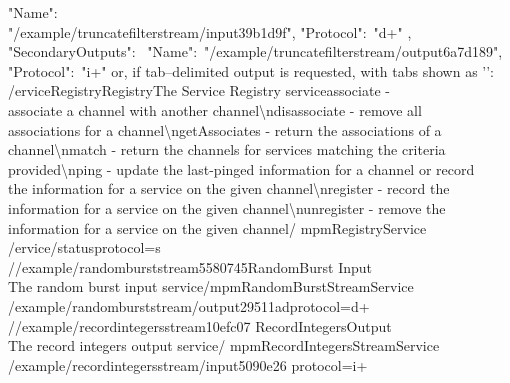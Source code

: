 \textbraceleft{} "Name":\ \\
"/example/truncatefilterstream/input\textunderscore{}39b1d9f", "Protocol":\ "d+"
\textbraceright{} \closeSq,\\
"SecondaryOutputs":\ \openSq{} \textbraceleft{} "Name":\
"/example/truncatefilterstream/output\textunderscore{}6a7d189", "Protocol":\ "i+"
\textbraceright{} \closeSq{} \textbraceright{} \closeSq
\outputEnd{}
or, if tab--delimited output is requested, with tabs shown as
'\texttt{\boldmath{$\vdash$}}':
\outputBegin{}
/\textdollar{}ervice\pseudotab{}Registry\pseudotab{}Registry\pseudotab{}The Service
Registry service\pseudotab{}associate - \\
associate a channel with another channel\textbackslash{}ndisassociate - remove all\\
associations for a channel\textbackslash{}ngetAssociates - return the associations of a\\
channel\textbackslash{}nmatch - return the channels for services matching the criteria\\
provided\textbackslash{}nping - update the last-pinged information for a channel or
record\\
the information for a service on the given channel\textbackslash{}nregister - record the\\
information for a service on the given channel\textbackslash{}nunregister - remove the\\
information for a service on the given channel\pseudotab\textellipsis/%
mpmRegistryService\pseudotwotabs\\
/\textdollar{}ervice/status\textbraceleft{}protocol=s\textbraceright\\

/\serviceName/example/randomburststream\textunderscore{}5580745\pseudotab{}RandomBurst%
\pseudotab{}Input\pseudotab\\
The random burst input service\pseudotwotabs\textellipsis/mpmRandomBurstStreamService%
\pseudotwotabs\\
/example/randomburststream/output\textunderscore{}29511ad\textbraceleft{}protocol=d+%
\textbraceright\\

/\serviceName/example/recordintegersstream\textunderscore{}10efc07\pseudotab{}%
RecordIntegers\pseudotab{}Output\pseudotab\\
The record integers output service\pseudotwotabs\textellipsis/%
mpmRecordIntegersStreamService\pseudotab\\
/example/recordintegersstream/input\textunderscore{}5090e26\textbraceleft{}%
protocol=i+\textbraceright\\

